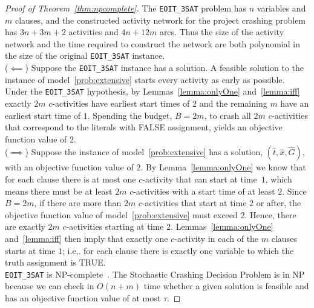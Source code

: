 \documentclass[11pt]{article}
\newcommand{\tcb}{\textcolor{blue}}
\begin{document}
	\begin{proof}[Proof of Theorem~\ref{thm:npcomplete}]
		The \verb|EOIT_3SAT| problem has \(n\) variables and \(m\) clauses, and the constructed activity network for the project crashing problem has $3n + 3m + 2$ activities and \(4n + 12m\)
		arcs. Thus the size of the activity network and the time required to construct the network are both polynomial in the size of the original \verb|EOIT_3SAT| instance. \\
		{(\(\impliedby\))} Suppose the \verb|EOIT_3SAT| instance has a solution. A feasible solution to the instance of model~\eqref{prob:extensive} starts every activity as early as possible. Under the \verb|EOIT_3SAT| hypothesis, by Lemmas~\ref{lemma:onlyOne} and~\ref{lemma:iff} exactly $2m$ $c$-activities have earliest start times of $2$ and the remaining $m$ have an earliest start time of $1$. Spending the budget, $B=2m$, to crash all $2m$ \(c\)-activities that correspond to the literals with FALSE assignment, yields an objective function value of \(2\). \\
		{(\(\implies\))} Suppose the instance of model~\eqref{prob:extensive} has a solution, \((\hat{t},\hat{x},\hat{G})\), with an objective function value of $2$. By Lemma~\ref{lemma:onlyOne} we know that for each clause there is at most one \(c\)-activity that can start at time~\(1\), which means there must be at least \(2m\) \(c\)-activities with a start time of at least $2$. Since $B=2m$, if there are more than \(2m\) \(c\)-activities that start at time \(2\) or after, the objective function value of model~\eqref{prob:extensive} must exceed 2. Hence, there are exactly \(2m\) \(c\)-activities starting at time \(2\). Lemmas~\ref{lemma:onlyOne} and~\ref{lemma:iff} then imply that exactly one \(c\)-activity in each of the \(m\) clauses starts at time \(1\); i.e,. for each clause there is exactly one variable to which the truth assignment is TRUE.\\
		\newline
		\verb|EOIT_3SAT| is NP-complete~\citep{Garey1979ComputersAI}. The {\sc Stochastic Crashing Decision Problem} is in NP because we can check in {\(O(n+m)\)} time whether a given solution is feasible and has an objective function value of at most $\tau$. %
	\end{proof}
\end{document}
